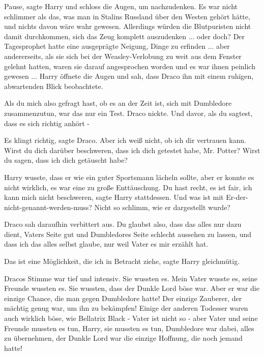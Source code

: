 \glqq{}Pause\grqq{}, sagte Harry und schloss die Augen, um nachzudenken. Es war
nicht schlimmer als das, was man in Stalins Russland über den Westen gehört
hätte, und nichts davon wäre wahr gewesen. Allerdings würden die Blutpuristen
nicht damit durchkommen, sich das Zeug komplett auszudenken ... oder doch? Der
Tagesprophet hatte eine ausgeprägte Neigung, Dinge zu erfinden ... aber
andererseits, als sie sich bei der Weasley-Verlobung zu weit aus dem Fenster
gelehnt hatten, waren sie darauf angesprochen worden und es war ihnen peinlich
gewesen ... Harry öffnete die Augen und sah, dass Draco ihn mit einem ruhigen,
abwartenden Blick beobachtete.

\glqq{}Als du mich also gefragt hast, ob es an der Zeit ist, sich mit Dumbledore
zusammenzutun, war das nur ein Test.\grqq{} Draco nickte. \glqq{}Und davor, als
du sagtest, dass es sich richtig anhört -\grqq{}

\glqq{}Es klingt richtig\grqq{}, sagte Draco. \glqq{}Aber ich weiß nicht, ob ich
dir vertrauen kann. Wirst du dich darüber beschweren, dass ich dich getestet
habe, Mr. Potter? Wirst du sagen, dass ich dich getäuscht habe?\grqq{}

Harry wusste, dass er wie ein guter Sportsmann lächeln sollte, aber er konnte es
nicht wirklich, es war eine zu große Enttäuschung. \glqq{}Du hast recht, es ist
fair, ich kann mich nicht beschweren\grqq{}, sagte Harry stattdessen. \glqq{}Und
was ist mit Er-der-nicht-genannt-werden-muss? Nicht so schlimm, wie er
dargestellt wurde?\grqq{}

Draco sah daraufhin verbittert aus. \glqq{}Du glaubst also, dass das alles nur
dazu dient, Vaters Seite gut und Dumbledores Seite schlecht aussehen zu lassen,
und dass ich das alles selbst glaube, nur weil Vater es mir erzählt hat.\grqq{}

\glqq{}Das ist eine Möglichkeit, die ich in Betracht ziehe\grqq{}, sagte Harry
gleichmütig.

Dracos Stimme war tief und intensiv. \glqq{}Sie wussten es. Mein Vater wusste es,
seine Freunde wussten es. Sie wussten, dass der Dunkle Lord böse war. Aber er
war die einzige Chance, die man gegen Dumbledore hatte! Der einzige Zauberer,
der mächtig genug war, um ihn zu bekämpfen! Einige der anderen Todesser waren
auch wirklich böse, wie Bellatrix Black - Vater ist nicht so - aber Vater und
seine Freunde mussten es tun, Harry, sie mussten es tun, Dumbledore war dabei,
alles zu übernehmen, der Dunkle Lord war die einzige Hoffnung, die noch jemand
hatte!\grqq{}

